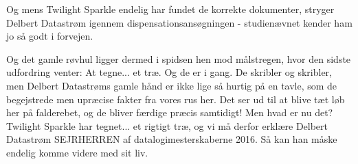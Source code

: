 \documentclass[a4paper,11pt]{article}
\begin{document}
\begin{sketch}
 Og mens Twilight Sparkle endelig har fundet de korrekte dokumenter, stryger Delbert Datastrøm igennem dispensationsansøgningen - studienævnet kender ham jo så godt i forvejen.



  Og det gamle røvhul ligger dermed i spidsen hen mod målstregen, hvor den sidste udfordring venter: At tegne... et træ. Og de er i gang. De skribler og skribler, men Delbert Datastrøms gamle hånd er ikke lige så hurtig på en tavle, som de begejstrede men upræcise fakter fra vores rus her. Det ser ud til at blive tæt løb her på falderebet, og de bliver færdige præcis samtidigt! Men hvad er nu det? Twilight Sparkle har tegnet... et rigtigt træ, og vi må derfor erklære Delbert Datastrøm SEJRHERREN af datalogimesterskaberne 2016. Så kan han måske endelig komme videre med sit liv.




\end{sketch}
\end{document}
